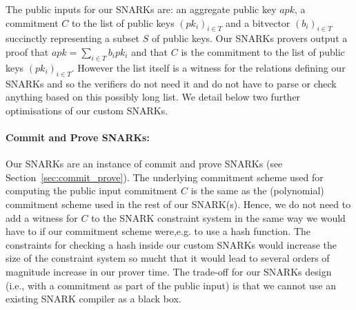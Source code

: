 \vspace{-0.05cm}
\noindent The public inputs for our SNARKs are: an aggregate public key $\mathit{apk}$, a commitment $C$ to the list of 
public keys $(pk_i)_{i \in T}$ and a bitvector $(b_i)_{i \in T}$ succinctly representing a subset $S$ of public keys. 
Our SNARKs provers output a proof that $apk=\sum_{i \in T} b_i pk_i$ and that $C$ is the commitment to the list of public keys 
$(pk_i)_{i \in T}$. However the list itself is a witness for the relations defining our SNARKs and so the verifiers do not need it 
and do not have to parse or check anything based on this possibly long list. 
We detail below two further optimisations of our custom SNARKs.

\vspace{-0.05in}
\paragraph{Commit and Prove SNARKs:} Our SNARKs are an instance of commit and prove SNARKs (see Section~\ref{sec:commit_prove}). 
The underlying commitment scheme used for computing the public input commitment $C$ is the same as the (polynomial) commitment scheme used in the rest of our SNARK(s). Hence, we do not need to add a witness for $C$ 
to the SNARK constraint system in the same way we would have to if our commitment scheme were,e.g. to use a hash function.
The constraints for checking a hash inside our custom SNARKs would increase the size of the constraint system so mucht that it would lead to several orders of magnitude increase in our prover time. 
The trade-off for our SNARKs design (i.e., with a commitment as part of the public input) is that we cannot use an existing SNARK compiler as a black box.

